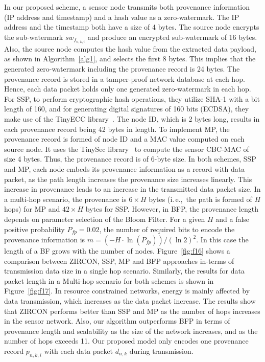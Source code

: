 \documentclass{llncs}
\newcommand{\ie}{i.\,e.,~}
\begin{document}
In our proposed scheme, a sensor node transmits both provenance information (IP address and timestamp) and a hash value as a zero-watermark. The IP address and the timestamp both have a size of 4 bytes. The source node encrypts the sub-watermark $sw_{f_{n,k,i}}$ and produce an encrypted sub-watermark of 16 bytes. Also, the source node computes the hash value from the extracted data payload, as shown in Algorithm~\ref{alg1}, and selects the first 8 bytes. This implies that the generated zero-watermark including the provenance record is 24 bytes. The provenance record is stored in a tamper-proof network database at each hop. Hence, each data packet holds only one generated zero-watermark in each hop. For SSP, to perform cryptographic hash operations, they utilize SHA-1 with a bit length of 160, and for generating digital signatures of 160 bits (ECDSA), they make use of the TinyECC library~\cite{Liu2008}. The node ID, which is 2 bytes long, results in each provenance record being 42 bytes in length. To implement MP, the provenance record is formed of node ID and a MAC value computed on each source node. It uses the TinySec library~\cite{Karlof2004} to compute the sensor CBC-MAC of size 4 bytes. Thus, the provenance record is of 6-byte size. In both schemes, SSP and MP, each node embeds its provenance information as a record with data packet, as the path length increases the provenance size increases linearly. This increase in provenance leads to an increase in the transmitted data packet size. In a multi-hop scenario, the provenance is $6 \times H$ bytes (\ie the path is formed of $H$ hops) for MP and $42 \times H$ bytes for SSP. However, in BFP, the provenance length depends on parameter selection of the Bloom Filter. For a given $H$ and a false positive probability $P_{fp} = 0.02$, the number of required bits to encode the provenance information is $m = (-H\cdot \ln(P_{fp}))/(\ln 2)^2$. In this case the length of a BF grows with the number of nodes. Figure~\ref{fig:f16} shows a comparison between ZIRCON, SSP, MP and BFP approaches in-terms of transmission data size in a single hop scenario. Similarly, the results for data packet length in a Multi-hop scenario for both schemes is shown in Figure~\ref{fig:f17}. In resource constrained networks, energy is mainly affected by data transmission, which increases as the data packet increase. The results show that ZIRCON performs better than SSP and MP as the number of hops increases in the sensor network. Also, our algorithm outperforms BFP in terms of provenance length and scalability as the size of the network increases, and as the number of hops exceeds 11. Our proposed model only encodes one provenance record $p_{n,k,i}$ with each data packet $d_{n,k}$ during transmission.
\end{document}
